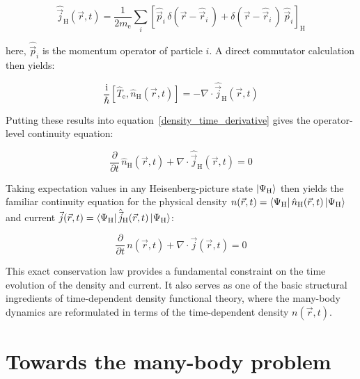 \begin{equation}
    \hat{\vec{j}}_\mathrm{H}(\vec{r},t)
    = \frac{1}{2m_\mathrm{e}}\sum_i\left[\hat{\vec{p}}_i\,\delta(\vec{r}-\hat{\vec{r}}_i\,)+\delta(\vec{r}-\hat{\vec{r}}_i\,)\,\hat{\vec{p}}_i\right]_\mathrm{H}
\label{heisenberg-picture_current_operator}
\end{equation}

here, $\hat{\vec{p}}_i$ is the momentum operator of particle $i$. A direct commutator calculation then yields:

\begin{equation}
    \frac{\mathrm{i}}{\hbar}\left[\hat{T}_\mathrm{e},\hat n_\mathrm{H}(\vec{r},t)\right]
    = -\nabla\cdot\hat{\vec{j}}_\mathrm{H}(\vec{r},t)
\label{direct_commutator}
\end{equation}

Putting these results into equation~\eqref{density_time_derivative} gives the operator-level continuity equation:

\begin{equation}
\frac{\partial}{\partial t}\,\hat{n}_\mathrm{H}(\vec{r},t)+\nabla\cdot\hat{\vec j}_\mathrm{H}(\vec{r},t)=0
\label{continuity_operator}
\end{equation}

Taking expectation values in any Heisenberg-picture state $\ket{\Psi_\mathrm{H}}$ then yields the familiar continuity equation for the physical density $n(\vec{r},t)=\bra{\Psi_\mathrm{H}}\hat{n}_\mathrm{H}(\vec{r},t)\ket{\Psi_\mathrm{H}}$
and current $\vec{j}(\vec{r},t)=\bra{\Psi_\mathrm{H}}\hat{\vec{j}}_\mathrm{H}(\vec{r},t)\ket{\Psi_\mathrm{H}}$:

\begin{equation}
    \frac{\partial}{\partial t}\,n(\vec{r},t)+\nabla\cdot\vec{j}(\vec{r},t)=0
\label{continuity_expectation}
\end{equation}

This exact conservation law provides a fundamental constraint on the time evolution of the density and current. It also serves as one of the basic structural ingredients of time-dependent density functional theory, where the many-body dynamics are reformulated in terms of the time-dependent density $n(\vec{r},t)$.

\newpage
\FloatBarrier
\section{Towards the many-body problem}
\label{sec:toward_many_body_problem}

